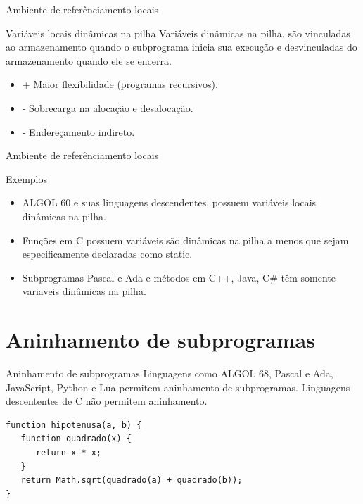 \begin{frame}{Ambiente de referênciamento locais}
\begin{block}{Variáveis locais dinâmicas na pilha}
	Variáveis dinâmicas na pilha, são vinculadas ao armazenamento quando o subprograma inicia sua execução e desvinculadas do armazenamento quando ele se encerra.
	\begin{itemize}
	  \item + Maior flexibilidade (programas recursivos).
	  \item - Sobrecarga na alocação e desalocação.
	  \item - Endereçamento indireto.
	\end{itemize}
\end{block}
\end{frame}

\begin{frame}{Ambiente de referênciamento locais}
\begin{block}{Exemplos}
	\begin{itemize}
	  \item ALGOL 60 e suas linguagens descendentes, possuem variáveis locais dinâmicas na pilha.
	  \item Funções em C possuem variáveis são dinâmicas na pilha a menos que sejam especificamente declaradas como static. 
	  \item Subprogramas Pascal e Ada e métodos em C++, Java, C\# têm somente variaveis dinâmicas na pilha. 
	\end{itemize}
\end{block}
\end{frame}

\section{Aninhamento de subprogramas} 
\begin{frame}[fragile]{Aninhamento de subprogramas}
Linguagens como ALGOL 68, Pascal e Ada, JavaScript, Python e Lua permitem aninhamento de subprogramas. Linguagens descententes de C não permitem aninhamento.
\begin{verbatim}
function hipotenusa(a, b) {
   function quadrado(x) {
      return x * x; 
   }
   return Math.sqrt(quadrado(a) + quadrado(b));
}
\end{verbatim}
\end{frame}
